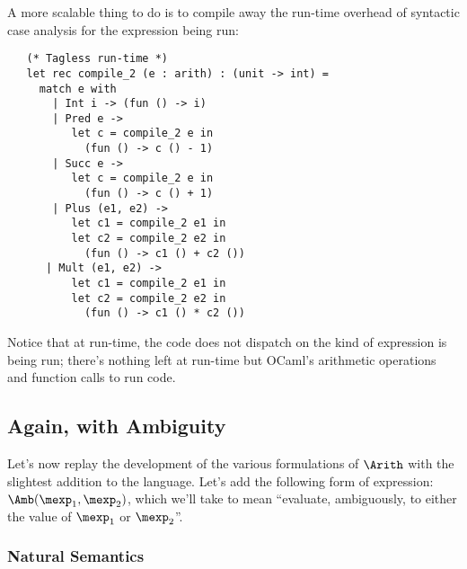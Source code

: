 A more scalable thing to do is to compile away the run-time overhead
of syntactic case analysis for the expression being run:
\begin{verbatim}
   (* Tagless run-time *)
   let rec compile_2 (e : arith) : (unit -> int) =
     match e with
       | Int i -> (fun () -> i)
       | Pred e ->
          let c = compile_2 e in
            (fun () -> c () - 1)
       | Succ e ->
          let c = compile_2 e in
            (fun () -> c () + 1)
       | Plus (e1, e2) ->
          let c1 = compile_2 e1 in
          let c2 = compile_2 e2 in
            (fun () -> c1 () + c2 ())
      | Mult (e1, e2) ->
          let c1 = compile_2 e1 in
          let c2 = compile_2 e2 in
            (fun () -> c1 () * c2 ())
\end{verbatim}

Notice that at run-time, the code does not dispatch on the kind of
expression is being run; there's nothing left at run-time but OCaml's
arithmetic operations and function calls to run code.



\subsection{Again, with Ambiguity}

Let's now replay the development of the various formulations of
$\Arith$ with the slightest addition to the language.  Let's add the
following form of expression: $\Amb(\mexp_1,\mexp_2)$, which we'll
take to mean ``evaluate, ambiguously, to either the value of $\mexp_1$
or $\mexp_2$''.

\subsubsection{Natural Semantics}

